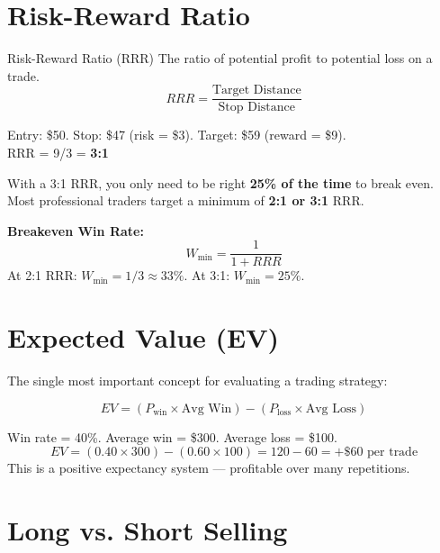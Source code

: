 \section{Risk-Reward Ratio}

\begin{keyterm}{Risk-Reward Ratio (RRR)}
The ratio of potential profit to potential loss on a trade.
\[
  RRR = \frac{\text{Target Distance}}{\text{Stop Distance}}
\]
\end{keyterm}

\begin{examplebox}
Entry: \$50. Stop: \$47 (risk = \$3). Target: \$59 (reward = \$9). \\
RRR = 9/3 = \textbf{3:1}
\end{examplebox}

With a 3:1 RRR, you only need to be right \textbf{25\% of the time} to break even.
Most professional traders target a minimum of \textbf{2:1 or 3:1} RRR.

\begin{formulabox}
\textbf{Breakeven Win Rate:}
\[
  W_{\min} = \frac{1}{1 + RRR}
\]
At 2:1 RRR: $W_{\min} = 1/3 \approx 33\%$. At 3:1: $W_{\min} = 25\%$.
\end{formulabox}

\section{Expected Value (EV)}

The single most important concept for evaluating a trading strategy:

\begin{formulabox}
\[
  EV = (P_{\text{win}} \times \text{Avg Win}) - (P_{\text{loss}} \times \text{Avg Loss})
\]
\end{formulabox}

\begin{examplebox}
Win rate = 40\%. Average win = \$300. Average loss = \$100.
\[
  EV = (0.40 \times 300) - (0.60 \times 100) = 120 - 60 = +\$60 \text{ per trade}
\]
This is a positive expectancy system — profitable over many repetitions.
\end{examplebox}

\section{Long vs. Short Selling}

